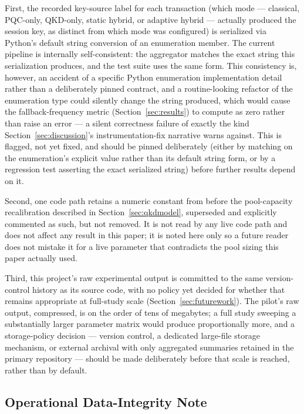 \documentclass[journal]{IEEEtran}
\begin{document}
First, the recorded key-source label for each transaction (which mode --- classical, PQC-only, QKD-only, static hybrid, or adaptive hybrid --- actually produced the session key, as distinct from which mode was configured) is serialized via Python's default string conversion of an enumeration member. The current pipeline is internally self-consistent: the aggregator matches the exact string this serialization produces, and the test suite uses the same form. This consistency is, however, an accident of a specific Python enumeration implementation detail rather than a deliberately pinned contract, and a routine-looking refactor of the enumeration type could silently change the string produced, which would cause the fallback-frequency metric (Section~\ref{sec:results}) to compute as zero rather than raise an error --- a silent correctness failure of exactly the kind Section~\ref{sec:discussion}'s instrumentation-fix narrative warns against. This is flagged, not yet fixed, and should be pinned deliberately (either by matching on the enumeration's explicit value rather than its default string form, or by a regression test asserting the exact serialized string) before further results depend on it.

Second, one code path retains a numeric constant from before the pool-capacity recalibration described in Section~\ref{sec:qkdmodel}, superseded and explicitly commented as such, but not removed. It is not read by any live code path and does not affect any result in this paper; it is noted here only so a future reader does not mistake it for a live parameter that contradicts the pool sizing this paper actually used.

Third, this project's raw experimental output is committed to the same version-control history as its source code, with no policy yet decided for whether that remains appropriate at full-study scale (Section~\ref{sec:futurework}). The pilot's raw output, compressed, is on the order of tens of megabytes; a full study sweeping a substantially larger parameter matrix would produce proportionally more, and a storage-policy decision --- version control, a dedicated large-file storage mechanism, or external archival with only aggregated summaries retained in the primary repository --- should be made deliberately before that scale is reached, rather than by default.

\subsection{Operational Data-Integrity Note}
\end{document}
